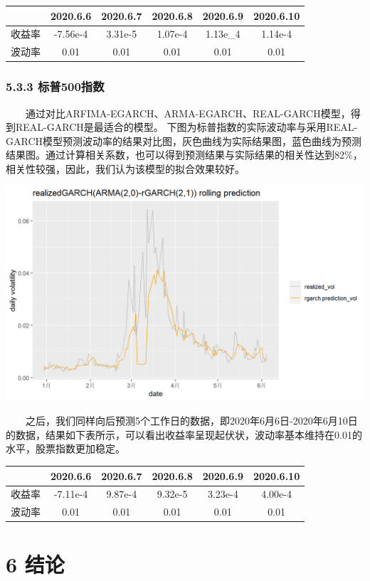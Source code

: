 \documentclass[
  11pt,
  letterpaper,
]{article}
\begin{document}
\begin{longtable}[]{@{}cccccc@{}}
\toprule
& 2020.6.6 & 2020.6.7 & 2020.6.8 & 2020.6.9 & 2020.6.10\tabularnewline
\midrule
\endhead
收益率 & -7.56e-4 & 3.31e-5 & 1.07e-4 & 1.13e\_4 &
1.14e-4\tabularnewline
波动率 & 0.01 & 0.01 & 0.01 & 0.01 & 0.01\tabularnewline
\bottomrule
\end{longtable}

\hypertarget{ux6807ux666e500ux6307ux6570}{%
\subsubsection{5.3.3 标普500指数}\label{ux6807ux666e500ux6307ux6570}}

  通过对比ARFIMA-EGARCH、ARMA-EGARCH、REAL-GARCH模型，得到REAL-GARCH是最适合的模型。
下图为标普指数的实际波动率与采用REAL-GARCH模型预测波动率的结果对比图，灰色曲线为实际结果图，蓝色曲线为预测结果图。通过计算相关系数，也可以得到预测结果与实际结果的相关性达到82\%，相关性较强，因此，我们认为该模型的拟合效果较好。

\includegraphics[width=0.7\linewidth]{./17}

  之后，我们同样向后预测5个工作日的数据，即2020年6月6日-2020年6月10日的数据，结果如下表所示，可以看出收益率呈现起伏状，波动率基本维持在0.01的水平，股票指数更加稳定。

\begin{longtable}[]{@{}cccccc@{}}
\toprule
& 2020.6.6 & 2020.6.7 & 2020.6.8 & 2020.6.9 & 2020.6.10\tabularnewline
\midrule
\endhead
收益率 & -7.11e-4 & 9.87e-4 & 9.32e-5 & 3.23e-4 & 4.00e-4\tabularnewline
波动率 & 0.01 & 0.01 & 0.01 & 0.01 & 0.01\tabularnewline
\bottomrule
\end{longtable}

\hypertarget{ux7ed3ux8bba}{%
\section{6 结论}\label{ux7ed3ux8bba}}
\end{document}
